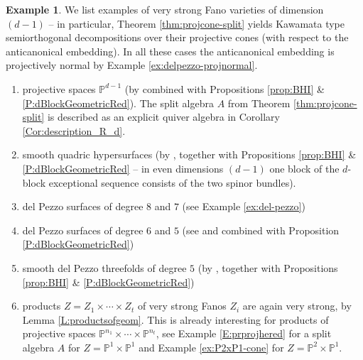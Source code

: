 \documentclass[a4paper,11pt, reqno]{amsart}
\def\P{\mathbb P}
\theoremstyle{plain}
\theoremstyle{definition}
\newtheorem{example}[dummy]{Example}
\numberwithin{equation}{section}
\begin{document}
\begin{example}\label{ex:projspace-quadric}
We list examples of very strong Fano varieties of dimension $(d-1)$ -- in particular, Theorem \ref{thm:projcone-split} yields Kawamata type semiorthogonal decompositions over their projective cones (with respect to the anticanonical embedding). In all these cases the anticanonical embedding is projectively normal by Example \ref{ex:delpezzo-projnormal}. 


\begin{enumerate}[label=(\alph*)]
    \item projective spaces $\P^{d-1}$ (by \cite{beilinson} combined with Propositions \ref{prop:BHI}  \& \ref{P:dBlockGeometricRed}). The split algebra $A$ from Theorem \ref{thm:projcone-split} is described as an explicit quiver algebra in Corollary \ref{Cor:description_R_d}. 
    \item smooth quadric hypersurfaces (by \cite{Kap}, together with 
  Propositions \ref{prop:BHI}  \& \ref{P:dBlockGeometricRed} -- in even dimensions $(d-1)$ one block of the $d$-block exceptional sequence consists of the two spinor bundles).
  \item del Pezzo surfaces of degree $8$ and $7$ (see Example \ref{ex:del-pezzo})
  \item del Pezzo surfaces of degree $6$ and $5$ (see \cite[Proof of Proposition 4.2, case (3) and (4)]{karpov-nogin} and \cite[Example 8.6 (c)]{BridgelandStern} combined with Proposition \ref{P:dBlockGeometricRed})
\item smooth del Pezzo threefolds of degree  $5$ (by \cite{orlov-V5}, together with
  Propositions \ref{prop:BHI} \&  \ref{P:dBlockGeometricRed})
  \item products $Z=Z_1 \times \cdots \times Z_t$ of very strong Fanos $Z_i$ are again very strong, by Lemma \ref{L:productsofgeom}. This is already interesting for products of projective spaces $\P^{n_1} \times \cdots \times \P^{n_t}$, see Example \ref{E:prprojhered} for a split algebra $A$ for $Z=\P^1 \times \P^1$ and Example \ref{ex:P2xP1-cone} for $Z=\P^2 \times \P^1$.
\end{enumerate} 
\end{example}
\end{document}

